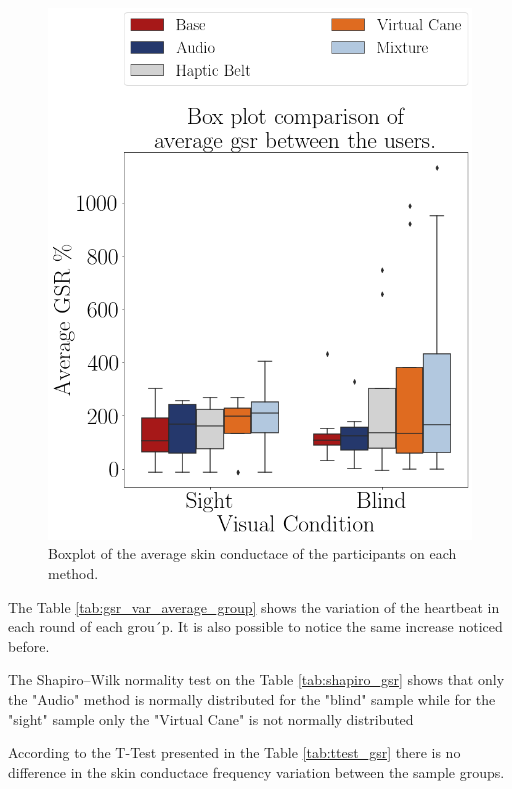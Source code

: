 \begin{figure}[!htb]
    \centering
    \includegraphics[width = 0.5\linewidth]{Resultados/GSR/Figuras/png/boxplot_gsr_scene.png}
    \caption{Boxplot of the average skin conductace of the participants on each method.}
    \label{fig:boxplot_gsr_scene}
\end{figure}

The Table \ref{tab:gsr_var_average_group} shows the variation of the heartbeat in each round of each grou´p. It is also possible to notice the same increase noticed before.





The Shapiro–Wilk normality test on the Table \ref{tab:shapiro_gsr} shows that only the "Audio" method is normally distributed for the "blind" sample while for the "sight" sample only the "Virtual Cane" is not normally distributed

According to the T-Test presented in the Table \ref{tab:ttest_gsr} there is no difference in the skin conductace  frequency variation between the sample groups.


\begin{table}[!htb]
    \begin{minipage}{.45\linewidth}
        
    \end{minipage}
    \hfill
    \begin{minipage}{.45\linewidth}
        \vspace{-2.75cm}
        
    \end{minipage}
\end{table}

